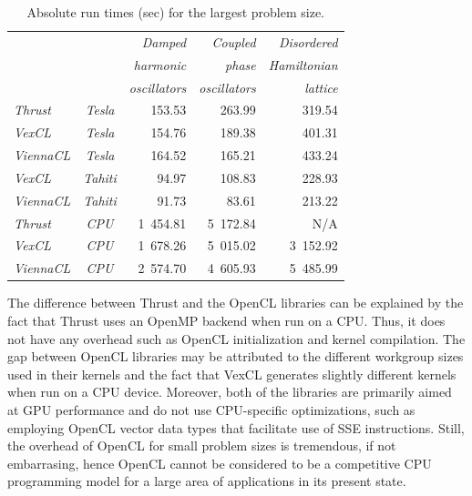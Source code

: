 \documentclass[final]{siamltex}
\begin{document}
\begin{table}
 \centering
    \caption{Absolute run times (sec) for the largest problem size.}
    \label{tab:abstimes}
    \begin{tabular}{|lc|rrr|}
        \hline
        & & \em Damped      & \em Coupled       & \em Disordered  \\ %
        & & \em harmonic    & \em phase         & \em Hamiltonian \\ %
        & & \em oscillators & \em oscillators   & \em lattice     \\ %
        \hline
        \em Thrust   &\em Tesla & 153.53 & 263.99 & 319.54 \\ %
        \em VexCL    &\em Tesla & 154.76 & 189.38 & 401.31 \\ %
        \em ViennaCL &\em Tesla & 164.52 & 165.21 & 433.24 \\ %
        \hline
        \em VexCL    &\em Tahiti &  94.97 & 108.83 & 228.93 \\ %
        \em ViennaCL &\em Tahiti &  91.73 &  83.61 & 213.22 \\ %
        \hline
        \em Thrust   &\em CPU   & 1~454.81 & 5~172.84 &      N/A \\ %
        \em VexCL    &\em CPU   & 1~678.26 & 5~015.02 & 3~152.92 \\ %
        \em ViennaCL &\em CPU   & 2~574.70 & 4~605.93 & 5~485.99 \\ %
        \hline
    \end{tabular}
\end{table}


The difference between Thrust and the OpenCL libraries can be explained by the fact
that Thrust uses an OpenMP backend when run on a CPU. Thus, it does not have any
overhead such as OpenCL initialization and kernel compilation.  The gap
between OpenCL libraries may be attributed to the different workgroup sizes
used in their kernels and the fact that VexCL generates slightly different
kernels when run on a CPU device. Moreover, both of the libraries are primarily
aimed at GPU performance and do not use CPU-specific optimizations, such as
employing OpenCL vector data types that facilitate use of SSE instructions.
Still, the overhead of OpenCL for small problem sizes is tremendous, if not embarrasing,
hence OpenCL cannot be considered to be a competitive CPU programming model for a large area of applications in its present state.
\end{document}

